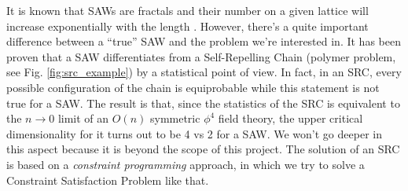 It is known that SAWs are fractals and their number on a given lattice will increase exponentially with the length \cite{madras1988pivot}.
However, there's a quite important difference between a ``true'' SAW and the problem we're interested in.
It has been proven \cite{trueSAW} that a SAW differentiates from a Self-Repelling Chain (polymer problem, see Fig. \ref{fig:src_example}) by a statistical point of view.
In fact, in an SRC, every possible configuration of the chain is equiprobable while this statement is not true for a SAW.
The result is that, since the statistics of the SRC is equivalent to the $n \to 0$ limit of an $O(n)$ symmetric $\phi^4$ field theory, the upper critical dimensionality for it turns out to be 4 vs 2 for a SAW.
We won't go deeper in this aspect because it is beyond the scope of this project.
The solution of an SRC is based on a \emph{constraint programming} approach, in which we try to solve a Constraint Satisfaction Problem like that.

